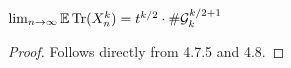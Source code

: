 \begin{proposition}%
  \label{prop:limit_stuff}
  \notready
  $\lim_{n\to\infty} {\mathbb{E}}\operatorname{Tr}(X_n^k) = t^{k/2}\cdot\#\mathcal{G}_k^{k/2+1}$
\end{proposition}

\begin{proof}
  \notready
  Follows directly from 4.7.5 and 4.8.
\end{proof}
